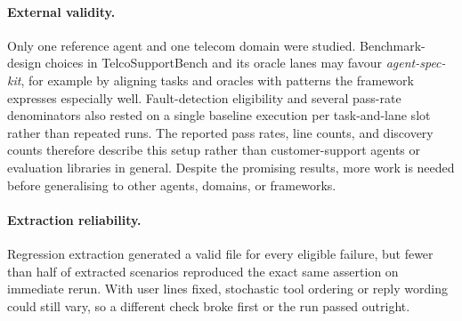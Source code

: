 \paragraph{External validity.}
Only one reference agent and one telecom domain were studied. Benchmark-design choices in TelcoSupportBench and its oracle lanes may favour \emph{agent-spec-kit}, for example by aligning tasks and oracles with patterns the framework expresses especially well. Fault-detection eligibility and several pass-rate denominators also rested on a single baseline execution per task-and-lane slot rather than repeated runs. The reported pass rates, line counts, and discovery counts therefore describe this setup rather than customer-support agents or evaluation libraries in general. Despite the promising results, more work is needed before generalising to other agents, domains, or frameworks.

\paragraph{Extraction reliability.}
Regression extraction generated a valid file for every eligible failure, but fewer than half of extracted scenarios reproduced the exact same assertion on immediate rerun. With user lines fixed, stochastic tool ordering or reply wording could still vary, so a different check broke first or the run passed outright.
